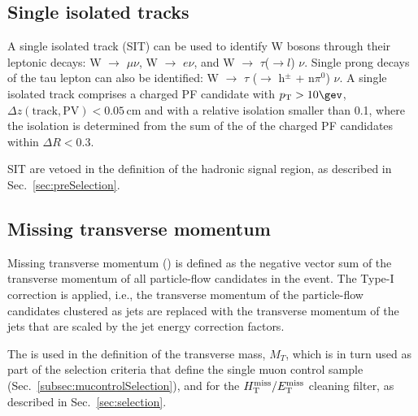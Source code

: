 \subsection{Single isolated tracks}
\label{sec:SIT}

A single isolated track (SIT) can be used to identify W bosons through their leptonic decays: 
W $\rightarrow$ $\mu \nu$, W $\rightarrow$ $e\nu$, and W $\rightarrow$ $\tau$($\rightarrow l$) $\nu$. 
Single prong decays of the tau lepton can also be identified: W $\rightarrow$ $\tau$ ($\rightarrow$ h$^{\pm}$ + n$\pi^{0}$) $\nu$. 
A single isolated track comprises a charged PF candidate with $\Pt > 10 \gev$, $\Delta z(\mathrm{track}, \mathrm{PV}) < 0.05 \, \mathrm{cm}$ 
and with a relative isolation smaller than 0.1, where the isolation is determined from the sum 
of the \Pt of the charged PF candidates within $\Delta R < 0.3$.

SIT are vetoed in the definition of the hadronic signal region, 
as described in Sec.~\ref{sec:preSelection}.


\subsection{Missing transverse momentum}
Missing transverse momentum (\met) is defined as the negative vector sum
of the transverse momentum of all particle-flow candidates in the event.
The Type-I \met correction \cite{Khachatryan:2014gga} is applied, i.e., the transverse momentum of
the particle-flow candidates clustered as jets are replaced with the
transverse momentum of the jets that are scaled by the jet energy
correction factors.

The \met is used in the definition of 
the transverse mass, $M_{T}$, which is in turn used as part of
the selection criteria that define the single muon control sample 
(Sec.~\ref{subsec:mucontrolSelection}), and for the $\mbox{$\mbox{$H_{\rm T}^{\rm miss}$} / \mbox{$E_\text{T}^{\rm miss}$}$}$ cleaning filter, 
as described in Sec.~\ref{sec:selection}.



